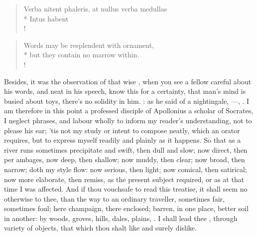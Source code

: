 {\begin{latin}
\begin{verse}
Verba nitent phaleris, at nullus verba medullas\\*
Intus habent\\!
\end{verse}
\end{latin}
\translationrule%
\begin{verse}
Words may be resplendent with ornament,\\*
but they contain no marrow within.\\!
\end{verse}

Besides, it was the observation of that wise \Seneca, when you see
a fellow careful about his words, and neat in his speech, know this for
a certainty, that man's mind is busied about toys, there's no solidity
in him. : as he said of a
nightingale, ---, \etc. I am therefore in this
point a professed disciple of Apollonius a scholar of Socrates, I
neglect phrases, and labour wholly to inform my reader's understanding,
not to please his ear; 'tis not my study or intent to compose neatly,
which an orator requires, but to express myself readily and plainly as
it happens. So that as a river runs sometimes precipitate and swift,
then dull and slow; now direct, then per ambages, now deep, then
shallow; now muddy, then clear; now broad, then narrow; doth my style
flow: now serious, then light; now comical, then satirical; now more
elaborate, then remiss, as the present subject required, or as at that
time I was affected. And if thou vouchsafe to read this treatise, it
shall seem no otherwise to thee, than the way to an ordinary traveller,
sometimes fair, sometimes foul; here champaign, there enclosed; barren,
in one place, better soil in another: by woods, groves, hills, dales,
plains, \etc. I shall lead thee , through variety of objects,
that which thou shalt like and surely dislike.

}
